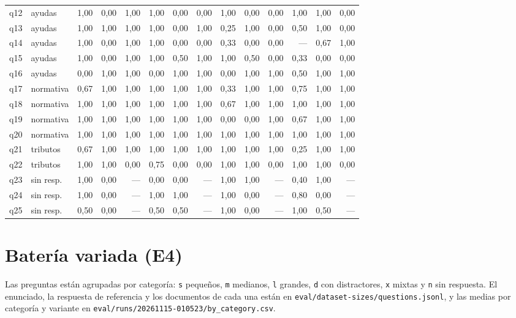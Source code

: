 \begin{footnotesize}
\begin{longtable}{@{}l l rrr rrr rrr rrr@{}}
q12 & ayudas & 1,00 & 0,00 & 1,00 & 1,00 & 0,00 & 0,00 & 1,00 & 0,00 & 0,00 & 1,00 & 1,00 & 0,00 \\
q13 & ayudas & 1,00 & 1,00 & 1,00 & 1,00 & 0,00 & 1,00 & 0,25 & 1,00 & 0,00 & 0,50 & 1,00 & 0,00 \\
q14 & ayudas & 1,00 & 0,00 & 1,00 & 1,00 & 0,00 & 0,00 & 0,33 & 0,00 & 0,00 & --- & 0,67 & 1,00 \\
q15 & ayudas & 1,00 & 0,00 & 1,00 & 1,00 & 0,50 & 1,00 & 1,00 & 0,50 & 0,00 & 0,33 & 0,00 & 0,00 \\
q16 & ayudas & 0,00 & 1,00 & 1,00 & 0,00 & 1,00 & 1,00 & 0,00 & 1,00 & 1,00 & 0,50 & 1,00 & 1,00 \\
q17 & normativa & 0,67 & 1,00 & 1,00 & 1,00 & 1,00 & 1,00 & 0,33 & 1,00 & 1,00 & 0,75 & 1,00 & 1,00 \\
q18 & normativa & 1,00 & 1,00 & 1,00 & 1,00 & 1,00 & 1,00 & 0,67 & 1,00 & 1,00 & 1,00 & 1,00 & 1,00 \\
q19 & normativa & 1,00 & 1,00 & 1,00 & 1,00 & 1,00 & 1,00 & 0,00 & 0,00 & 1,00 & 0,67 & 1,00 & 1,00 \\
q20 & normativa & 1,00 & 1,00 & 1,00 & 1,00 & 1,00 & 1,00 & 1,00 & 1,00 & 1,00 & 1,00 & 1,00 & 1,00 \\
q21 & tributos & 0,67 & 1,00 & 1,00 & 1,00 & 1,00 & 1,00 & 1,00 & 1,00 & 1,00 & 0,25 & 1,00 & 1,00 \\
q22 & tributos & 1,00 & 1,00 & 0,00 & 0,75 & 0,00 & 0,00 & 1,00 & 1,00 & 0,00 & 1,00 & 1,00 & 0,00 \\
q23 & sin resp. & 1,00 & 0,00 & --- & 0,00 & 0,00 & --- & 1,00 & 1,00 & --- & 0,40 & 1,00 & --- \\
q24 & sin resp. & 1,00 & 0,00 & --- & 1,00 & 1,00 & --- & 1,00 & 0,00 & --- & 0,80 & 0,00 & --- \\
q25 & sin resp. & 0,50 & 0,00 & --- & 0,50 & 0,50 & --- & 1,00 & 0,00 & --- & 1,00 & 0,50 & --- \\
\bottomrule
\end{longtable}
\end{footnotesize}

\section{Batería variada (E4)}

Las preguntas están agrupadas por categoría: \texttt{s} pequeños, \texttt{m} medianos, \texttt{l} grandes, \texttt{d} con distractores, \texttt{x} mixtas y \texttt{n} sin respuesta. El enunciado, la respuesta de referencia y los documentos de cada una están en \texttt{eval/dataset-sizes/questions.jsonl}, y las medias por categoría y variante en \texttt{eval/runs/20261115-010523/by\_category.csv}.

